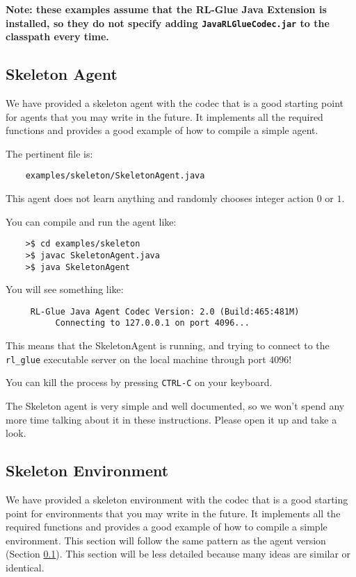 \documentclass[11pt]{article}
\begin{document}
\textbf{Note: these examples assume that the RL-Glue Java Extension is installed, so they do not specify adding \texttt{JavaRLGlueCodec.jar} to the classpath every time.}

\subsection{Skeleton Agent}
\label{sec:agent}
We have provided a skeleton agent with the codec that is a good starting point for agents that you may write in the future.
It implements all the required functions and provides a good example of how to compile a simple agent.

The pertinent file is:
\begin{verbatim}
	examples/skeleton/SkeletonAgent.java
\end{verbatim}

This agent does not learn anything and randomly chooses integer action $0$ or $1$.  

You can compile and run the agent like:
\begin{verbatim}
	>$ cd examples/skeleton
	>$ javac SkeletonAgent.java
	>$ java SkeletonAgent
\end{verbatim}

You will see something like:
\begin{verbatim}
     RL-Glue Java Agent Codec Version: 2.0 (Build:465:481M)
          Connecting to 127.0.0.1 on port 4096...
\end{verbatim}

This means that the SkeletonAgent is running, and trying to connect to the \texttt{rl\_glue} executable server on the local machine through port $4096$! 

You can kill the process by pressing \texttt{CTRL-C} on your keyboard.

The Skeleton agent is very simple and well documented, so we won't spend any more time talking about it in these instructions.
Please open it up and take a look.

\subsection{Skeleton Environment}
\label{sec:env}
We have provided a skeleton environment with the codec that is a good starting point for environments that you may write in the future.
It implements all the required functions and provides a good example of how to compile a simple environment.  This section will follow the same 
pattern as the agent version (Section \ref{sec:agent}).  This section will be less detailed because many ideas are similar or identical.
\end{document}
